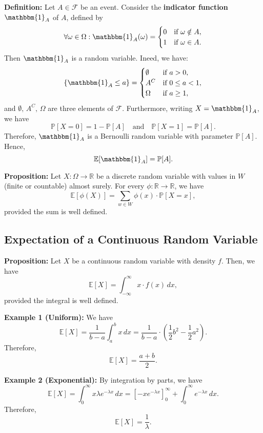 \documentclass[a4paper]{extarticle}
\begin{document}
\textbf{Definition:} Let \(A \in \mathcal{F}\) be an event. Consider the \textbf{indicator function} \(\mathbbm{1}_A\) of \(A\), defined by
\[
    \forall \omega \in \Omega : \mathbbm{1}_A(\omega) = \begin{cases}
        0 & \text{if } \omega \notin A,\\
        1 & \text{if } \omega \in A.
    \end{cases}
\]
Then \(\mathbbm{1}_A\) is a random variable. Ineed, we have:
\[
    \{\mathbbm{1}_A \leq a\} = \begin{cases}
        \emptyset & \text{if } a > 0,\\
        A^C & \text{if } 0 \leq a < 1,\\
        \Omega & \text{if }a \geq 1,
    \end{cases}
\]
and \(\emptyset, \, A^C, \, \Omega\) are three elements of \(\mathcal{F}\). Furthermore, writing \(X = \mathbbm{1}_A\), we have
\[
    \mathbb{P}[X = 0] = 1 - \mathbb{P}[A] \quad \text{and} \quad \mathbb{P}[X = 1] = \mathbb{P}[A].
\]
Therefore, \(\mathbbm{1}_A\) is a Bernoulli random variable with parameter \(\mathbb{P}[A]\). Hence,
\[
    \mathbb{E}[\mathbbm{1}_A] = \mathbb{P}[A].
\]

\begin{cbox}
    \textbf{Proposition:} Let \(X : \Omega \to \mathbb{R}\) be a discrete random variable with values in \(W\) (finite or countable) almost surely. For every \(\phi : \mathbb{R} \to \mathbb{R}\), we have
    \[
        \mathbb{E}[\phi(X)] = \sum_{w \in W} \phi(x) \cdot \mathbb{P}[X = x],
    \]
    provided the sum is well defined.
\end{cbox}

\subsection{Expectation of a Continuous Random Variable}

\begin{cbox}
    \textbf{Proposition:} Let \(X\) be a continuous random variable with density \(f\). Then, we have
    \[
        \mathbb{E}[X] = \int_{-\infty}^{\infty} x \cdot f(x) \, dx,
    \]
    provided the integral is well defined.
\end{cbox}

\begin{ebox}
    \textbf{Example 1 (Uniform):} We have
    \[
        \mathbb{E}[X] = \frac{1}{b-a} \int_a^b x \, dx = \frac{1}{b - a} \cdot (\frac{1}{2} b^2 - \frac{1}{2}a^2).
    \]
    Therefore,
    \[
        \mathbb{E}[X] = \frac{a + b}{2}.
    \]

    \textbf{Example 2 (Exponential):} By integration by parts, we have
    \[
        \mathbb{E}[X] = \int_0^{\infty} x \lambda e^{- \lambda x} \, dx = [-xe^{- \lambda x}]_0^{\infty} + \int_0^{\infty} e^{- \lambda x} \, dx.
    \]
    Therefore,
    \[
        \mathbb{E}[X] = \frac{1}{\lambda}.
    \]
\end{ebox}
\end{document}
